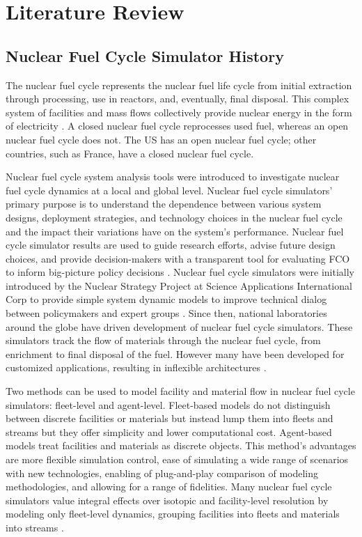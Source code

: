 \chapter{Literature Review}
\label{chap:2}
\section{Nuclear Fuel Cycle Simulator History}
The nuclear fuel cycle represents the nuclear fuel life cycle from initial
extraction through processing, use in reactors, and, eventually, 
final disposal.
This complex system of facilities and mass flows 
collectively provide nuclear energy 
in the form of electricity \cite{yacout_modeling_2005}.
A closed nuclear fuel cycle reprocesses used fuel, whereas an open 
nuclear fuel cycle does not.  
The US has an open nuclear fuel cycle; other countries, such as France, 
have a closed nuclear fuel cycle. 

Nuclear fuel cycle system analysis tools were introduced to investigate 
nuclear fuel cycle dynamics at a local and global level. 
Nuclear fuel cycle simulators' primary purpose   
is to understand the dependence between various system designs, deployment 
strategies, and technology choices
in the nuclear fuel cycle and the impact their variations have on 
the system's performance. 
Nuclear fuel cycle simulator results are used to guide research 
efforts, advise future design choices, and provide 
decision-makers with a transparent tool for evaluating \gls{FCO} 
to inform big-picture policy decisions \cite{yacout_modeling_2005}.
Nuclear fuel cycle simulators were initially introduced 
by the Nuclear Strategy Project at Science Applications International Corp 
to provide simple system dynamic models to improve technical dialog between 
policymakers and expert groups \cite{yacout_modeling_2005}.
Since then, national laboratories around the globe have driven 
development of nuclear fuel cycle simulators. 
These simulators track the flow of materials through the nuclear fuel cycle, 
from enrichment to final disposal of the fuel. 
However many have been developed for customized applications, resulting in 
inflexible architectures \cite{huff_fundamental_2016}.  

Two methods can be used to model facility and material flow in 
nuclear fuel cycle simulators: fleet-level and agent-level.  
Fleet-based models do not distinguish between discrete facilities 
or materials but instead lump them into fleets and streams but they 
offer simplicity and lower computational cost. 
Agent-based models treat facilities and materials as discrete 
objects. 
This method's advantages are more flexible simulation control,
ease of simulating a wide range of scenarios with new 
technologies, enabling of plug-and-play comparison of modeling 
methodologies, and allowing for a range of fidelities.  
Many nuclear fuel cycle simulators value integral effects over isotopic and 
facility-level resolution by modeling only fleet-level dynamics,
grouping facilities into fleets and materials into streams \cite{huff_fundamental_2016}.


